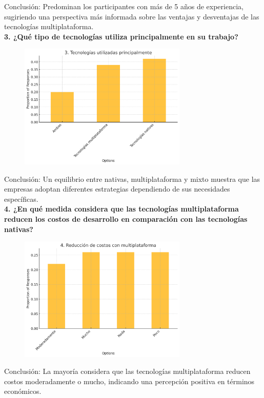 Conclusión: Predominan los participantes con más de 5 años de experiencia, sugiriendo una perspectiva más informada sobre las ventajas y desventajas de las tecnologías multiplataforma.\\

\textbf{3. ¿Qué tipo de tecnologías utiliza principalmente en su trabajo?}

\begin{figure}[h!]
    \includegraphics[width=8cm]{images/question3.png}
    \centering
\end{figure}

Conclusión: Un equilibrio entre nativas, multiplataforma y mixto muestra que las empresas adoptan diferentes estrategias dependiendo de sus necesidades específicas.\\

\textbf{4. ¿En qué medida considera que las tecnologías multiplataforma reducen los
costos de desarrollo en comparación con las tecnologías nativas?}

\begin{figure}[h!]
    \includegraphics[width=8cm]{images/question4.png}
    \centering
\end{figure}

Conclusión: La mayoría considera que las tecnologías multiplataforma reducen costos moderadamente o mucho, indicando una percepción positiva en términos económicos.\\

